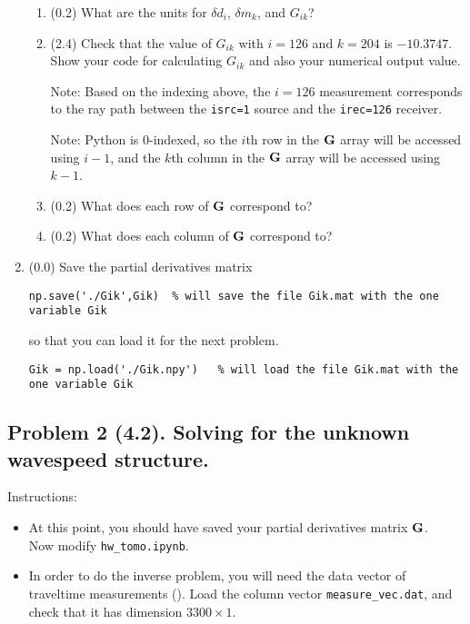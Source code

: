 \documentclass[11pt,titlepage,fleqn]{article}
\newcommand{\tfiletomo}{{\tt hw\_tomo.ipynb}}
\begin{document}
\begin{enumerate}
\begin{itemize}
\end{itemize}

\begin{enumerate}
\item (0.2) What are the units for $\delta d_i$, $\delta m_k$, and $G_{ik}$?

\item (2.4) Check that the value of $G_{ik}$ with $i=126$ and $k=204$ is $-10.3747$. \\ Show your code for calculating $G_{ik}$ and also your numerical output value.

Note: Based on the indexing above, the $i=126$ measurement corresponds to the ray path between the \verb+isrc=1+ source and the \verb+irec=126+ receiver.

Note: Python is 0-indexed, so the $i$th row in the $\mbox{${\bf G}$}$ array will be accessed using $i-1$, and the $k$th column in the $\mbox{${\bf G}$}$ array will be accessed using $k-1$.

\item (0.2) What does each row of $\mbox{${\bf G}$}$ correspond to?

\item (0.2) What does each column of $\mbox{${\bf G}$}$ correspond to?
\end{enumerate}


\item (0.0) Save the partial derivatives matrix
%
\begin{verbatim}
np.save('./Gik',Gik)  % will save the file Gik.mat with the one variable Gik
\end{verbatim}
%
so that you can load it for the next problem.
%
\begin{verbatim}
Gik = np.load('./Gik.npy')   % will load the file Gik.mat with the one variable Gik
\end{verbatim}

\end{enumerate}


\subsection*{Problem 2 (4.2). Solving for the unknown wavespeed structure.}

Instructions:
%
\begin{itemize}
\item At this point, you should have saved your partial derivatives matrix $\mbox{${\bf G}$}$. \\ Now modify \tfiletomo.

\item In order to do the inverse problem, you will need the data vector of traveltime measurements (). Load the column vector \verb+measure_vec.dat+, and check that it has dimension \mbox{$3300 \times 1$}.

\end{itemize}
\end{document}
